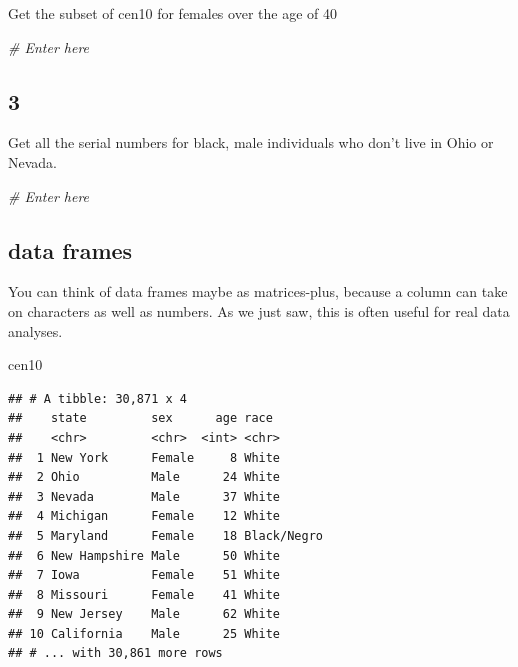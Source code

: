 \documentclass[]{book}
\newenvironment{Shaded}{\begin{snugshade}}{\end{snugshade}}
\newcommand{\CommentTok}[1]{\textcolor[rgb]{0.56,0.35,0.01}{\textit{#1}}}
\newcommand{\NormalTok}[1]{#1}
\theoremstyle{definition}
\theoremstyle{definition}
\theoremstyle{definition}
\theoremstyle{remark}
\begin{document}
Get the subset of cen10 for females over the age of 40

\begin{Shaded}
\begin{Highlighting}[]
\CommentTok{# Enter here}
\end{Highlighting}
\end{Shaded}

\hypertarget{section-8}{%
\subsection*{3}\label{section-8}}

Get all the serial numbers for black, male individuals who don't live in Ohio or Nevada.

\begin{Shaded}
\begin{Highlighting}[]
\CommentTok{# Enter here}
\end{Highlighting}
\end{Shaded}

\hypertarget{data-frames}{%
\subsection{data frames}\label{data-frames}}

You can think of data frames maybe as matrices-plus, because a column can take on characters as well as numbers. As we just saw, this is often useful for real data analyses.

\begin{Shaded}
\begin{Highlighting}[]
\NormalTok{cen10}
\end{Highlighting}
\end{Shaded}

\begin{verbatim}
## # A tibble: 30,871 x 4
##    state         sex      age race       
##    <chr>         <chr>  <int> <chr>      
##  1 New York      Female     8 White      
##  2 Ohio          Male      24 White      
##  3 Nevada        Male      37 White      
##  4 Michigan      Female    12 White      
##  5 Maryland      Female    18 Black/Negro
##  6 New Hampshire Male      50 White      
##  7 Iowa          Female    51 White      
##  8 Missouri      Female    41 White      
##  9 New Jersey    Male      62 White      
## 10 California    Male      25 White      
## # ... with 30,861 more rows
\end{verbatim}
\end{document}
